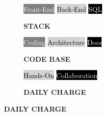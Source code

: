 \documentclass[9pt]{developercv} %
\begin{document}
 \begin{figure}[!ht]
 
\captionsetup[subfigure]{labelformat=empty}
\begin{subfigure}{.3\textwidth}
\centering
{}
{\colorbox{gray}{
\textcolor{white}{Front-End}}
\break
\colorbox{lightgray}{
\textcolor{black}{Back-End}}
\break
\colorbox{black}{
\textcolor{white}{SQL}}}
\caption{\textbf{STACK}}
\end{subfigure}%
\begin{subfigure}{.3\textwidth}
\centering
{}
{\colorbox{gray}{
\textcolor{white}{Coding}}
\break
\colorbox{lightgray}{
\textcolor{black}{Architecture}}
\break
\colorbox{black}{
\textcolor{white}{Docs}}}
\caption{\textbf{CODE BASE}}
\end{subfigure}%
\begin{subfigure}{.3\textwidth}
\centering
{}
{
\colorbox{lightgray}{
\textcolor{black}{Hands-On}}
\break
\colorbox{black}{
\textcolor{white}{Collaboration}}}
\caption{\textbf{DAILY CHARGE}}
\end{subfigure}%
\end{figure}


      
     


\end{document}
